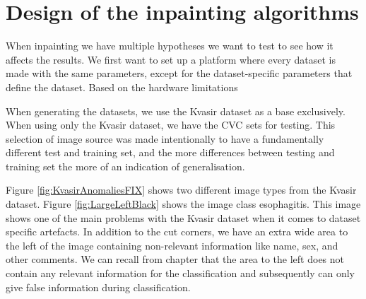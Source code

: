 


\section{Design of the inpainting algorithms}
When inpainting we have multiple hypotheses we want to test to see how it affects the results. We first want to set up a platform where every dataset is made with the same parameters, except for the dataset-specific parameters that define the dataset. Based on the hardware limitations 

When generating the datasets, we use the Kvasir dataset as a base exclusively. When using only the Kvasir dataset, we have the CVC sets for testing. This selection of image source was made intentionally to have a fundamentally different test and training set, and the more differences between testing and training set the more of an indication of generalisation. 


Figure \ref{fig:KvasirAnomaliesFIX} shows two different image types from the Kvasir dataset. 
Figure \ref{fig:LargeLeftBlack} shows the image class esophagitis. This image shows one of the main problems with the Kvasir dataset when it comes to dataset specific artefacts. In addition to the cut corners, we have an extra wide area to the left of the image containing non-relevant information like name, sex, and other comments. We can recall from chapter  that the area to the left does not contain any relevant information for the classification and subsequently can only give false information during classification. 

